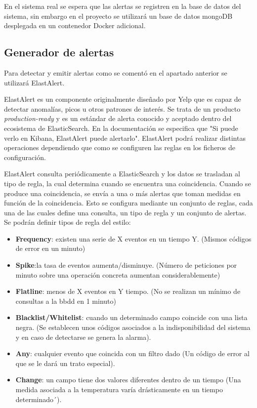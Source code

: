 En el sistema real se espera que las alertas se registren en la base de datos del sistema, sin embargo en el proyecto se utilizará un base de datos mongoDB desplegada en un contenedor Docker adicional.

\subsection{Generador de alertas}

Para detectar y emitir alertas como se comentó en el apartado anterior se utilizará ElastAlert.

ElastAlert es un componente originalmente diseñado por Yelp que es capaz de detectar anomalías, picos u otros patrones de interés. Se trata de un producto \textit{production-ready} y es un estándar de alerta conocido y aceptado dentro del ecosistema de ElasticSearch. En la documentación se especifica que "Si puede verlo en Kibana, ElastAlert puede alertarlo". ElastAlert podrá realizar distintas operaciones dependiendo que como se configuren las reglas en los ficheros de configuración. 

ElastAlert consulta periódicamente a ElasticSearch y los datos se trasladan al tipo de regla, la cual determina cuando se encuentra una coincidencia. Cuando se produce una coincidencia, se envía a una o más alertas que toman medidas en función de la coincidencia. Esto se configura mediante un conjunto de reglas, cada una de las cuales define una consulta, un tipo de regla y un conjunto de alertas. Se podrán definir tipos de regla del estilo:

\begin{itemize}
\item \textbf{Frequency}: existen una serie de X eventos en un tiempo Y. (Mismos códigos de error en un minuto)
\item \textbf{Spike}:la tasa de eventos aumenta/disminuye. (Número de peticiones por minuto sobre una operación concreta aumentan considerablemente) 
\item \textbf{Flatline}: menos de X eventos en Y tiempo. (No se realizan un mínimo de consultas a la bbdd en 1 minuto)
\item \textbf{Blacklist/Whitelist}: cuando un determinado campo coincide con una lista negra. (Se establecen unos códigos asociados a la indisponibilidad del sistema y en caso de detectarse se genera la alarma).
\item \textbf{Any}: cualquier evento que coincida con un filtro dado (Un código de error al que se le dará un trato especial).
\item \textbf{Change}: un campo tiene dos valores diferentes dentro de un tiempo (Una medida asociada a la temperatura varía drásticamente en un tiempo determinado´).


\end{itemize}

